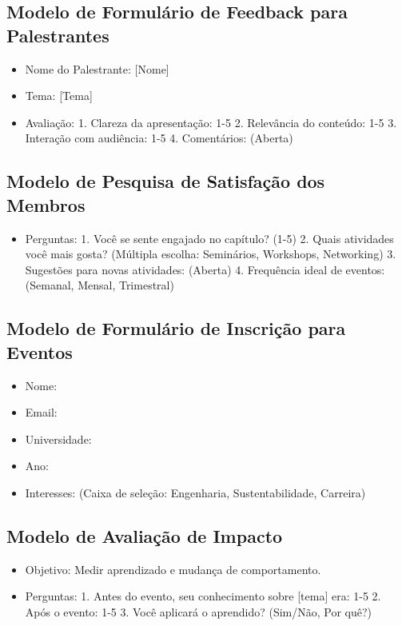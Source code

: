 \documentclass[12pt]{article}
\begin{document}
\subsection{Modelo de Formulário de Feedback para Palestrantes}
\begin{itemize}
    \item Nome do Palestrante: [Nome]
    \item Tema: [Tema]
    \item Avaliação:
      1. Clareza da apresentação: 1-5
      2. Relevância do conteúdo: 1-5
      3. Interação com audiência: 1-5
      4. Comentários: (Aberta)
\end{itemize}

\subsection{Modelo de Pesquisa de Satisfação dos Membros}
\begin{itemize}
    \item Perguntas:
      1. Você se sente engajado no capítulo? (1-5)
      2. Quais atividades você mais gosta? (Múltipla escolha: Seminários, Workshops, Networking)
      3. Sugestões para novas atividades: (Aberta)
      4. Frequência ideal de eventos: (Semanal, Mensal, Trimestral)
\end{itemize}

\subsection{Modelo de Formulário de Inscrição para Eventos}
\begin{itemize}
    \item Nome: 
    \item Email: 
    \item Universidade: 
    \item Ano: 
    \item Interesses: (Caixa de seleção: Engenharia, Sustentabilidade, Carreira)
\end{itemize}

\subsection{Modelo de Avaliação de Impacto}
\begin{itemize}
    \item Objetivo: Medir aprendizado e mudança de comportamento.
    \item Perguntas:
      1. Antes do evento, seu conhecimento sobre [tema] era: 1-5
      2. Após o evento: 1-5
      3. Você aplicará o aprendido? (Sim/Não, Por quê?)
\end{itemize}
\end{document}
